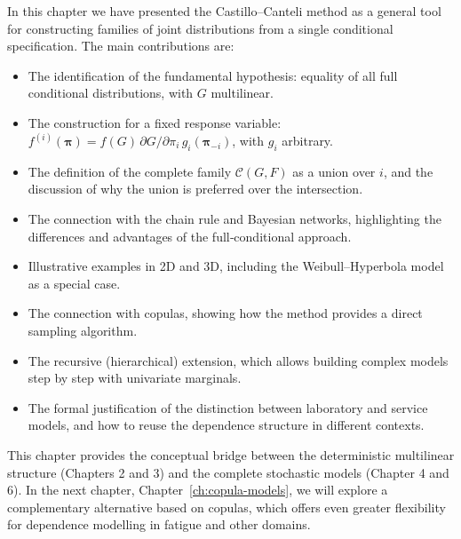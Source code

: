 In this chapter we have presented the Castillo–Canteli method as a general tool for constructing families of joint distributions from a single conditional specification. The main contributions are:

\begin{itemize}
    \item The identification of the fundamental hypothesis: equality of all full conditional distributions, with \(G\) multilinear.
    \item The construction for a fixed response variable: \(f^{(i)}(\boldsymbol{\pi}) = f(G)\,\partial G/\partial\pi_i\,g_i(\boldsymbol{\pi}_{-i})\), with \(g_i\) arbitrary.
    \item The definition of the complete family \(\mathcal{C}(G,F)\) as a union over \(i\), and the discussion of why the union is preferred over the intersection.
    \item The connection with the chain rule and Bayesian networks, highlighting the differences and advantages of the full‑conditional approach.
    \item Illustrative examples in 2D and 3D, including the Weibull–Hyperbola model as a special case.
    \item The connection with copulas, showing how the method provides a direct sampling algorithm.
    \item The recursive (hierarchical) extension, which allows building complex models step by step with univariate marginals.
    \item The formal justification of the distinction between laboratory and service models, and how to reuse the dependence structure in different contexts.
\end{itemize}

This chapter provides the conceptual bridge between the deterministic multilinear structure (Chapters 2 and 3) and the complete stochastic models (Chapter 4 and 6). In the next chapter, Chapter~\ref{ch:copula-models}, we will explore a complementary alternative based on copulas, which offers even greater flexibility for dependence modelling in fatigue and other domains. 